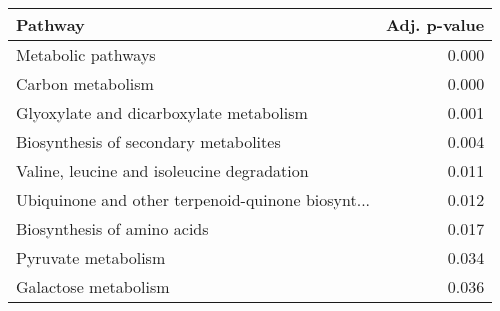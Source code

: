 \begin{tabular}{lr}
\toprule
                                           Pathway &  Adj. p-value \\
\midrule
                                Metabolic pathways &         0.000 \\
                                 Carbon metabolism &         0.000 \\
           Glyoxylate and dicarboxylate metabolism &         0.001 \\
             Biosynthesis of secondary metabolites &         0.004 \\
        Valine, leucine and isoleucine degradation &         0.011 \\
 Ubiquinone and other terpenoid-quinone biosynt... &         0.012 \\
                       Biosynthesis of amino acids &         0.017 \\
                               Pyruvate metabolism &         0.034 \\
                              Galactose metabolism &         0.036 \\
\bottomrule
\end{tabular}
